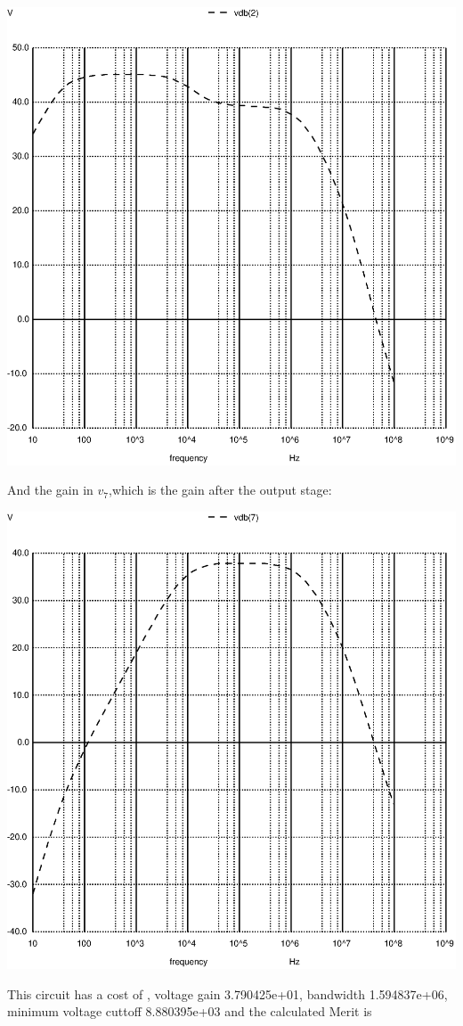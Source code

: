 \includegraphics[width=1\linewidth]{../sim/vo1f.ps}

And the gain in $v_7$,which is the gain after the output stage:

\includegraphics[width=1\linewidth]{../sim/vo2f.ps}

\par


This circuit has a cost of , voltage gain 3.790425e+01, bandwidth 1.594837e+06, minimum voltage cuttoff 8.880395e+03 and the  calculated Merit is 
